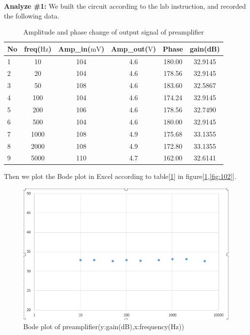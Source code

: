 \hfill \newline
\textbf{Analyze \#1:} \newline
\phantom{ } We built the circuit according to the lab instruction, and recorded the following data.\\
\begin{table}[!htbp]
	\centering
	\caption{Amplitude and phase change of output signal of preamplifier}
	\begin{tabular}{lccccc}
		\toprule
		No &freq($\si{\hertz}$) &Amp\_in($\si{\milli\volt}$)&Amp\_out($\si{\volt}$)&Phase&gain(dB)\\
		\midrule
		1	&10		&104	&4.6	&180.00	&32.9145\\
		2	&20		&104	&4.6	&178.56	&32.9145\\
		3	&50		&108	&4.6	&183.60	&32.5867\\
		4	&100	&104	&4.6	&174.24	&32.9145\\
		5	&200	&106	&4.6	&178.56	&32.7490\\
		6	&500	&104	&4.6	&180.00	&32.9145\\
		7	&1000	&108	&4.9	&175.68	&33.1355\\
		8	&2000	&108	&4.9	&172.80	&33.1355\\
		9	&5000	&110	&4.7	&162.00	&32.6141\\
		\bottomrule
	\end{tabular}
	\label{tab:preamp}
\end{table}
\phantom{ } Then we plot the Bode plot in Excel according to table[\ref{tab:preamp}] in figure[\ref{fig:101},\ref{fig:102}].

\begin{figure}[!htbp]
	\centering 
	\begin{framed}
		\includegraphics[width=\linewidth]{images/1_1.PNG} 
		\caption{Bode plot of preamplifier(y:gain(dB),x:frequency(Hz))}
		\label{fig:101} 
	\end{framed}
\end{figure} 

